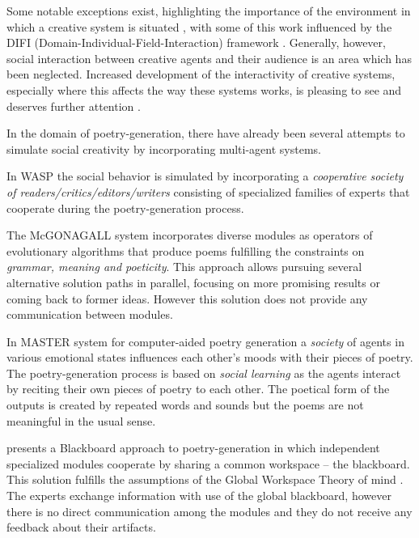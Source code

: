 Some notable exceptions exist, highlighting the importance of the
environment in which a creative system is situated \cite{mcgraw93,
  sosa09, perezyperez10MM, pease10, saunders12}, with some of this
work influenced by the DIFI (Domain-Individual-Field-Interaction)
framework \cite{csik88}. Generally, however, social interaction
between creative agents and their audience is an area which has been
neglected. Increased development of the interactivity of creative
systems, especially where this affects the way these systems works, is
pleasing to see and deserves further attention
\cite{coltonwiggins12}.

In the domain of poetry-generation, there have already been several attempts to simulate social creativity by incorporating multi-agent systems. 

In WASP \cite{gervas01,gervas10}  the social behavior is simulated by incorporating a \emph{cooperative society of readers/critics/editors/writers} consisting of specialized families of experts that cooperate during the poetry-generation process.

The McGONAGALL system \cite{manurung12} incorporates diverse modules as operators of evolutionary algorithms that produce poems fulfilling the constraints on \emph{grammar, meaning and poeticity}.  This approach allows pursuing several alternative solution paths in parallel, focusing on more promising results or coming back to former ideas. However this solution does not provide any communication between modules.

In MASTER system for computer-aided poetry generation \cite{kirke13} a \emph{society} of agents in various emotional states influences each other's moods with their pieces of poetry. The poetry-generation process is based on \emph{social learning} as the agents interact by reciting their own pieces of poetry to each other. The poetical form of the outputs is created by repeated words and sounds but the poems are not meaningful in the usual sense. 

\cite{misztal14} presents a Blackboard approach to poetry-generation in which independent specialized modules cooperate by sharing a common workspace -- the blackboard. This solution fulfills the assumptions of  the Global Workspace Theory of mind  \cite{baars97,baars03}. The experts exchange information with use of the global blackboard, however there is no direct communication among the modules and they do not receive any feedback about their artifacts.




